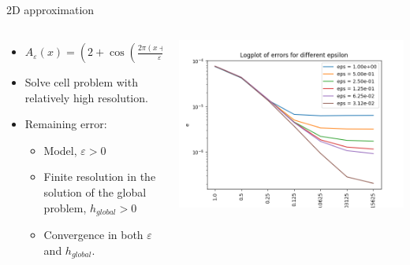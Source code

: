 \documentclass{beamer}
\renewcommand{\epsilon}{\varepsilon}
\begin{document}
\begin{frame}[t]{2D approximation}
  \begin{columns}
    \begin{column}[c]{.6\textwidth}
      \begin{itemize}
        \item
         $ A_\epsilon(x) =  \left( 2+\cos\left(\frac{2\pi(x+2y)}{\epsilon}\right) \right)^{-1}$
       \item Solve cell problem with relatively high resolution.
       \item Remaining error:
      \begin{itemize}
        \item Model, $\epsilon > 0$
        \item Finite resolution in the solution of the global problem, $ h_{global} > 0$
        \item Convergence in both  $\epsilon$ and $h_{global}$.
       \end{itemize}
      \end{itemize}
    \end{column}
    \begin{column}[c]{.5\textwidth}
      \includegraphics[width=0.9\linewidth]{2d_global_errors.png}      %
    \end{column}
  \end{columns}
\end{frame}
\end{document}
